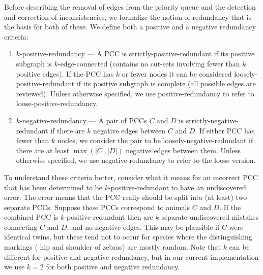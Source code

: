 Before describing the removal of edges from the priority queue and the
detection and correction of inconsistencies, we formalize the notion of
redundancy that is the basis for both of these.
We define both a positive and a negative redundancy criteria:
\begin{enumerate}[label={(\arabic*)},noitemsep,nolistsep]

    \item $k$-positive-redundancy --- %
        A PCC is strictly-positive-redundant if its positive subgraph is
          $k$-edge-connected (contains no cut-sets involving fewer than $k$
          positive edges\cite{Tarjan}).
        If the PCC has $k$ or fewer nodes it can be considered
          loosely-positive-redundant if its positive subgraph is complete (all
          possible edges are reviewed).
        Unless otherwise specified, we use positive-redundancy to refer to
          loose-positive-redundancy.

    \item $k$-negative-redundancy --- %
        A pair of PCCs $C$ and $D$ is strictly-negative-redundant if there are
          $k$ negative edges between $C$ and $D$.
        If either PCC has fewer than $k$ nodes, we consider the pair to be
          loosely-negative-redundant if there are at least $\mathop{max}(|C|,
          |D|)$ negative edges between them.
        Unless otherwise specified, we use negative-redundancy to refer to the
          loose version.

\end{enumerate}
To understand these criteria better, consider what it means for an incorrect
  PCC that has been determined to be $k$-positive-redundant to have an
  undiscovered error.
The error means that the PCC really should be split into (at least) two
  separate PCCs.
Suppose these PCCs correspond to animals $C$ and $D$.
If the combined PCC is $k$-positive-redundant then are $k$ separate
  undiscovered mistakes connecting $C$ and $D$, and no negative edges.
This may be plausible if $C$ were identical twins, but these tend not to occur
  for species where the distinguishing markings (\eg{} hip and shoulder of
  zebras) are mostly random.
Note that $k$ can be different for positive and negative redundancy, but in
  our current implementation we use $k=2$ for both positive and negative
  redundancy.

